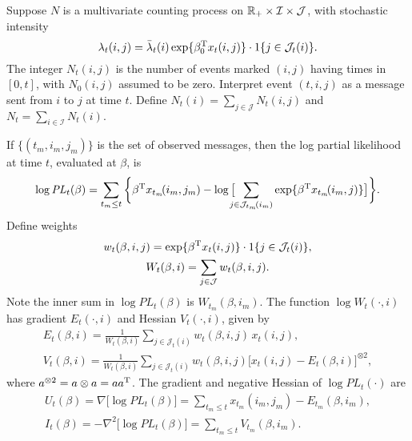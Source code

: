 \documentclass[aoas,preprint]{imsart}
\begin{document}
Suppose $N$ is a multivariate counting process on 
$\mathbb{R}_+ \times \mathcal{I} \times \mathcal{J}$,
with stochastic intensity
\begin{equation}\label{E:cox-intensity}
    \lambda_t(i,j)
        =
        \bar \lambda_t(i)
        \exp\{ \beta_0^\trans x_t(i, j) \}
        \cdot
        1{\{j \in \mathcal{J}_t(i)\}}.
\end{equation}
The integer $N_t(i,j)$ is the number of events marked $(i,j)$ having
times in  $[0,t]$, with $N_0(i,j)$ assumed to be zero.
Interpret event $(t, i, j)$ as a message sent from $i$ to $j$ at
time $t$.  Define
\(
    N_t(i) = \sum_{j \in \mathcal{J}} N_t(i,j)
\)
and
\(
    N_t = \sum_{i \in \mathcal{I}} N_t(i).
\)

  
If $\{ (t_m, i_m, j_m) \}$ is the set of observed messages, then
the log partial likelihood at time $t$, evaluated at $\beta$, is
\begin{equation}
    \log
    \mathit{PL}_t(\beta)
        =
        \sum_{t_m \leq t}
        \bigg\{
            \beta^\trans x_{t_m}\!(i_m, j_m)
            -
            \log\big[
                \!\!\!\!
                \sum_{j \in \mathcal{J}_{t_m}\!(i_m)}
                    \exp\{ \beta^\trans x_{t_m}\!(i_m, j)\}
            \big]
        \bigg\}.
\end{equation}
Define weights
\begin{gather}
    w_{t}(\beta, i,j)
        =
        \exp\{ \beta^\trans x_t(i,j) \}
        \cdot
        1\{ j \in \mathcal{J}_t(i)\}, \\
    W_{t}(\beta, i)
        =
        \sum_{j \in \mathcal{J}} w_{t}(\beta, i,j).
\end{gather}
Note the inner sum in $\log \mathit{PL}_t(\beta)$ is
$W_{t_m}\!(\beta, i_m)$.  The function 
$\log W_{t}(\cdot, i)$ has gradient $E_{t}(\cdot, i)$ and Hessian 
$V_{t}(\cdot, i)$, given by
\begin{gather}
    E_{t}(\beta, i)
        =
        \frac{1}{W_{t}(\beta, i)}
        \sum_{j \in \mathcal{J}_t(i)}
            w_{t}(\beta, i,j) \, x_{t}(i,j), \\
    V_{t}(\beta, i)
        =
        \frac{1}{W_{t}(\beta, i)}
        \sum_{j \in \mathcal{J}_t(i)}
            w_{t}(\beta, i,j) 
            \Big[ x_{t}(i,j) - E_{t}(\beta, i)\Big]^{\otimes 2},
\end{gather}
where $a^{\otimes 2} = a \otimes a = a a^{\mathrm{T}}$.
The gradient and negative Hessian of $\log \mathit{PL}_t(\cdot)$ are
\begin{gather}
    \label{E:pl-gradient}
    U_t(\beta)
        =
        \nabla \big[ \log \mathit{PL}_t(\beta) \big]
        =
        \sum_{t_m \leq t}
            x_{t_m}(i_m, j_m) - E_{t_m}(\beta, i_m), \\
    \label{E:pl-neg-hessian}            
    I_t(\beta)
        =
        -\nabla^2 \big[ \log \mathit{PL}_t(\beta) \big]
        =
        \sum_{t_m \leq t}
            V_{t_m}(\beta, i_m).
\end{gather}
\end{document}
